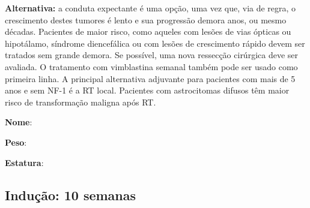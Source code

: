 \documentclass[11pt,a4paper,oldfontcommands]{memoir}
\begin{document}
\textbf{Alternativa:} a conduta expectante é uma opção, uma vez que, via de regra, o crescimento destes tumores é lento e sua progressão demora anos, ou mesmo décadas. Pacientes de maior risco, como aqueles com lesões de vias ópticas ou hipotálamo, síndrome diencefálica ou com lesões de crescimento rápido devem ser tratados sem grande demora. Se possível, uma nova ressecção cirúrgica deve ser avaliada. O tratamento com vimblastina semanal também pode ser usado como primeira linha. A principal alternativa adjuvante para pacientes com mais de 5 anos e sem NF-1 é a RT local. Pacientes com astrocitomas difusos têm maior risco de transformação maligna após RT.

\def\entrywithlabel[#1]#2{\parbox{#1}{{\small #2:} \hrulefill}}
\def\entrywithlabelunder[#1]#2{\parbox{#1}{\hrulefill\\[-.75ex]\centerline {#2}}}
\def\entrywithlabelraised[#1]#2{\parbox{#1}{\smash{\raise-1ex\hbox{{\tiny #2}}}\hrulefill}}
\def\boxentry[#1]#2{{\setlength{\fboxsep}{-\fboxrule}\fbox{\parbox{#1}{\smash{\raise-6.5pt\hbox{~{\tiny #2}}}\vspace{2ex}\mbox{}}}}}
\def\boxpar[#1]#2#3{{\setlength{\fboxsep}{-\fboxrule}\fbox{\parbox[][#2][t]{#1}{\mbox{}\\[-.125\baselineskip]\mbox{}~#3}}}}

\entrywithlabel[.96\hsize]{\textbf{Nome}}\hfill

\entrywithlabel[.45\hsize]{\textbf{Peso}}\hfill  \entrywithlabel[.45\hsize]{\textbf{Estatura}}

\subsection{Indução: 10 semanas}
\end{document}
